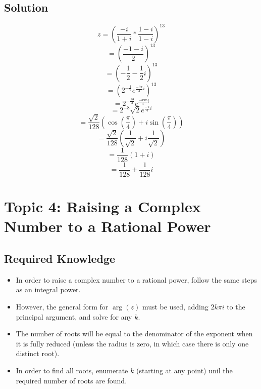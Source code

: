 \documentclass[12pt]{article}
\begin{document}
\subsection{Solution}

\begin{equation}
	z=(\frac{-i}{1+i}*\frac{1-i}{1-i})^{13}
\end{equation}
\begin{equation}
	=(\frac{-1-i}{2})^{13}
\end{equation}
\begin{equation}
	=(-\frac{1}{2}-\frac{1}{2}i)^{13}
\end{equation}
\begin{equation}
	=(2^{-\frac{1}{2}}e^{\frac{-3\pi}{4}i})^{13}
\end{equation}
\begin{equation}
	=2^{-\frac{13}{2}}e^{\frac{-39\pi}{4}i}
\end{equation}
\begin{equation}
	=2^{-8}\sqrt{2}e^{\frac{-\pi}{4}i}
\end{equation}
\begin{equation}
	=\frac{\sqrt{2}}{128}(\cos(\frac{\pi}{4})+i\sin(\frac{\pi}{4}))
\end{equation}
\begin{equation}
	=\frac{\sqrt{2}}{128}(\frac{1}{\sqrt{2}}+i\frac{1}{\sqrt{2}})
\end{equation}
\begin{equation}
	=\frac{1}{128}(1+i)
\end{equation}
\begin{equation}
	=\frac{1}{128}+\frac{1}{128}i
\end{equation}
\section{Topic 4: Raising a Complex Number to a Rational Power}
\subsection{Required Knowledge}
\begin{itemize}
    \item In order to raise a complex number to a rational power, follow the same steps as an integral power.
    \item However, the general form for $\arg(z)$ must be used, adding $2k\pi i$ to the principal argument, and solve for any $k$.
    \item The number of roots will be equal to the denominator of the exponent when it is fully reduced (unless the radius is zero, in which case there is only one distinct root).
    \item In order to find all roots, enumerate $k$ (starting at any point) unil the required number of roots are found.
\end{itemize}
\end{document}
